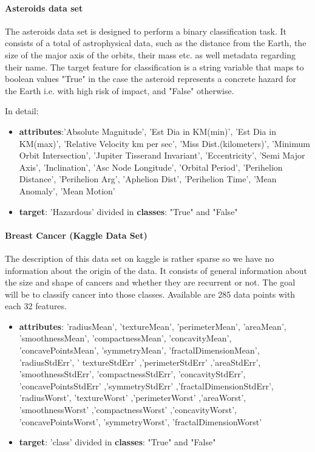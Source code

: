 \documentclass{article}
\begin{document}
\paragraph{Asteroids data set}
The asteroids data set\cite{KaggleAsteroidClassification} is designed to perform a binary classification task. It consists of a total of astrophysical data, such as the distance from the Earth, the size of the major axis of the orbits, their mass etc. as well metadata regarding their name. The target feature for classification is a string variable that maps to boolean values "True" in the case the asteroid represents a concrete hazard for the Earth i.e. with high risk of impact, and "False" otherwise.

In detail:
\begin{itemize}
	\item  \textbf{attributes}:'Absolute Magnitude', 'Est Dia in KM(min)', 'Est Dia in KM(max)', 'Relative Velocity km per sec', 'Miss Dist.(kilometers)', 'Minimum Orbit Intersection', 'Jupiter Tisserand Invariant', 'Eccentricity', 'Semi Major Axis', 'Inclination', 'Asc Node Longitude', 'Orbital Period', 'Perihelion   Distance', 'Perihelion Arg', 'Aphelion Dist', 'Perihelion Time', 'Mean Anomaly', 'Mean Motion' \\


	\item  \textbf{target}: 'Hazardous' divided in \textbf{classes}: "True" and "False" \\
\end{itemize}


\paragraph{Breast Cancer (Kaggle Data Set)}
The description of this data set on kaggle\cite{KaggleBreastCancer} is rather sparse so we have no information about the origin of the data. It consists of general information about the size and shape of cancers and whether they are recurrent or not. The goal will be to classify cancer into those classes. Available are 285 data points with each 32 features.

\begin{itemize}
	\item  \textbf{attributes}: 'radiusMean', 'textureMean', 'perimeterMean', 'areaMean',
	'smoothnessMean', 'compactnessMean', 'concavityMean',
	'concavePointsMean', 'symmetryMean', 'fractalDimensionMean',
	'radiusStdErr', ' textureStdErr' ,'perimeterStdErr' ,'areaStdErr',
	'smoothnessStdErr', 'compactnessStdErr', 'concavityStdErr',
	'concavePointsStdErr' ,'symmetryStdErr' ,'fractalDimensionStdErr',
	'radiusWorst', 'textureWorst' ,'perimeterWorst' ,'areaWorst',
	'smoothnessWorst' ,'compactnessWorst' ,'concavityWorst',
	'concavePointsWorst', 'symmetryWorst', 'fractalDimensionWorst' \\

	\item  \textbf{target}: 'class' divided in \textbf{classes}: "True" and "False" \\
\end{itemize}
\end{document}
